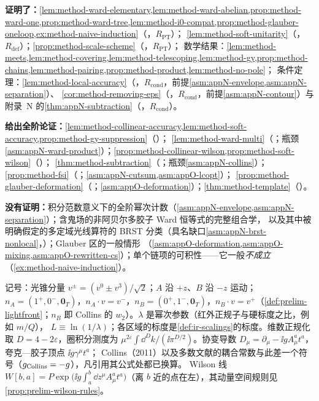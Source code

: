 \begin{tcolorbox}[enhanced,breakable,title=本章证明了什么／没有证明什么,fonttitle=\bfseries,
  colback=gray!3!white,colframe=gray!55!black,boxrule=0.6pt,arc=2pt,
  left=5pt,right=5pt,top=3pt,bottom=3pt,before skip=6pt,after skip=6pt]
\textbf{证明了：}\cref{lem:method-ward-elementary,lem:method-ward-abelian,prop:method-ward-one,prop:method-ward-tree,lem:method-i0-compat,prop:method-glauber-oneloop,ex:method-naive-induction}（\tagR，$R_{\mathrm{PT}}$）；
\cref{lem:method-soft-unitarity}（\tagR，$R_{\mathrm{def}}$）；\cref{prop:method-scale-scheme}（\tagR，$R_{\mathrm{PT}}$）；
数学结果：\cref{lem:method-meets,lem:method-covering,lem:method-telescoping,lem:method-gy,prop:method-chains,lem:method-pairing,prop:method-product,lem:method-no-pole}；
条件定理：\cref{lem:method-local-accuracy}（\tagR，$R_{\mathrm{cond}}$，前提\cref{asm:appN-envelope,asm:appN-separation}）、
\cref{cor:method-removing-eps}（\tagR，$R_{\mathrm{cond}}$，前提\cref{asm:appN-contour}）与附录~N 的\cref{thm:appN-subtraction}（\tagR，$R_{\mathrm{cond}}$）。\par
\textbf{给出全阶论证：}\cref{lem:method-collinear-accuracy,lem:method-soft-accuracy,prop:method-gy-suppression}（\tagA）；
\cref{lem:method-ward-multi}（\tagA；瓶颈\cref{asm:appN-ward-product}）；\cref{prop:method-collinear-wilson,prop:method-soft-wilson}（\tagA）；
\cref{thm:method-subtraction}（\tagA；瓶颈\cref{asm:appN-collins}）；\cref{prop:method-fsi}（\tagA；\cref{asm:appN-cutsum,asm:appO-lcopt}）；
\cref{prop:method-glauber-deformation}（\tagA；\cref{asm:appO-deformation}）；\cref{thm:method-template}（\tagA）。\par
\textbf{没有证明：}积分范数意义下的全阶幂次计数（\cref{asm:appN-envelope,asm:appN-separation}）；含鬼场的非阿贝尔多胶子 Ward 恒等式的完整组合学，
以及其中被明确假定的多定域光线算符的 BRST 分类（具名缺口\cref{asm:appN-brst-nonlocal}，\tagC）；Glauber 区的一般情形
（\cref{asm:appO-deformation,asm:appO-mixing,asm:appO-rewritten-cs}）；单个链项的可积性——它一般\emph{不成立}（\cref{ex:method-naive-induction}）。
\end{tcolorbox}

记号：光锥分量 $v^\pm=(v^0\pm v^3)/\sqrt2$；$A$ 沿 $+z$、$B$ 沿 $-z$ 运动；$n_A=(1^+,0^-,\mathbf 0_T)$，$n_A\cdot v=v^-$，$n_B=(0^+,1^-,\mathbf 0_T)$，$n_B\cdot v=v^+$（\cref{def:prelim-lightfront}；$n_B$ 即 Collins 的 $w_2$）。$\lambda$ 是幂次参数（红外正规子与硬标度之比，例如 $m/Q$），
$L\equiv\ln(1/\lambda)$；各区域的标度是\cref{def:ir-scalings}的标度。维数正规化取 $D=4-2\varepsilon$，圈积分测度为
$\mu^{2\varepsilon}\int\dd^Dk/(\ii\pi^{D/2})$。协变导数 $D_\mu=\partial_\mu-\ii gA^a_\mu t^a$，夸克—胶子顶点 $\ii g\gamma^\mu t^a$；
Collins（2011）以及多数文献的耦合常数与此差一个符号（$g_{\rm Collins}=-g$），凡引用其公式处都已换算。
Wilson 线 $W[b,a]=P\exp\bigl(\ii g\int_a^b\dd z^\mu A^a_\mu t^a\bigr)$（离 $b$ 近的点在左），其动量空间规则见\cref{prop:prelim-wilson-rules}。


